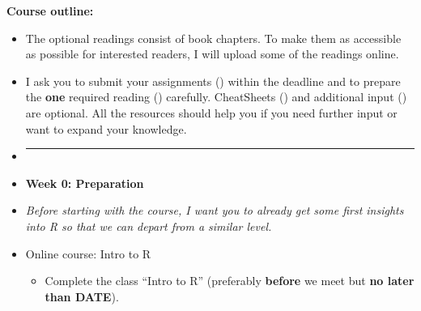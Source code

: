 \documentclass{article}
\begin{document}
\newpage

\noindent\textbf{Course outline:}  
\begin{itemize}
\item[] The optional readings consist of book chapters. To make them as accessible as possible for interested readers, I will upload some of the readings online.
\item[] I ask you to submit your assignments (\faExclamation) within the deadline and to prepare the \textbf{one} required reading (\faBook) carefully. CheatSheets (\faLightbulbO) and additional input (\faEdit) are optional. All the resources should help you if you need further input or want to expand your knowledge. 
\item[]


\vspace*{0.04in}
\noindent\rule{16cm}{0.7pt}
\vspace*{-0.45in}
\item[] \textbf{Week 0: Preparation}
\item[] \textit{Before starting with the course, I want you to already get some first insights into \textsf{R} so that we can depart from a similar level.}
\item[] \faExclamation \space 
\space Online course: Intro to \textsf{R}
\begin{itemize}   
\item[$\square$] Complete the class ``Intro to \textsf{R}'' (preferably \textbf{before} we meet but\textbf{ no later than DATE}).
\end{itemize}


\end{itemize}
\end{document}
